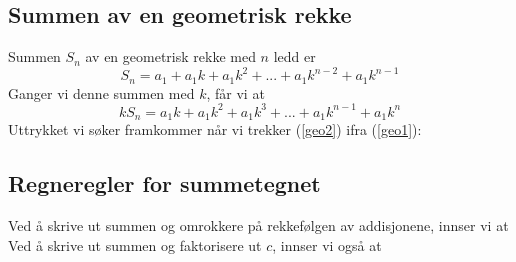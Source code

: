\subsection*{Summen av en geometrisk rekke}
Summen $ S_n $ av en geometrisk rekke med $ n $ ledd er
\begin{equation}
S_n = a_1 + a_1k + a_1k^2+...+a_1 k^{n-2}+a_1 k^{n-1} \label{geo1}
\end{equation}
Ganger vi denne summen med $ k $, får vi at
\begin{equation}
kS_n = a_1k + a_1k^2 + a_1k^3+...+a_1 k^{n-1}+a_1 k^{n} \label{geo2}
\end{equation}
Uttrykket vi søker framkommer når vi trekker (\ref{geo2}) ifra (\ref{geo1}):
\subsection*{Regneregler for summetegnet}
Ved å skrive ut summen og omrokkere på rekkefølgen av addisjonene, innser vi at
Ved å skrive ut summen og faktorisere ut $ c $, innser vi også at


